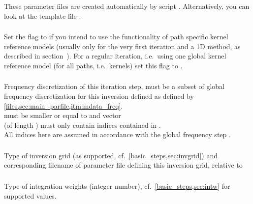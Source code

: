These parameter files are created automatically by script . 
Alternatively, you can look at the template file .
\subsubsection{}
Set the flag to  if you intend to use the \ASKI{} functionality of path specific kernel 
reference models (usually only for the very first iteration and a 1D method, as described in 
section~). For a regular iteration, i.e.\ using one 
global kernel reference model (for all paths, i.e.\ kernels) set this flag to .
\subsubsection{} \label{files,sec:iter_parfile,itm:iter_freq}
Frequency discretization of this iteration step, must be a subset of global frequency discretization 
for this inversion defined as defined by \ref{files,sec:main_parfile,itm:mdata_freq}. \\
 must be smaller or equal to  and vector \\
 (of length )
must only contain indices contained in .\\
All indices here are assumed in accordance with the global frequency step .
\subsubsection{} \label{files,sec:iter_parfile,itm:invgrid}
Type of inversion grid (as supported, cf.\ \ref{basic_steps,sec:invgrid}) and corresponding
filename of parameter file defining this inversion grid, relative to \\
\subsubsection{}
Type of integration weights (integer number), cf.\ \ref{basic_steps,sec:intw} for supported values.
